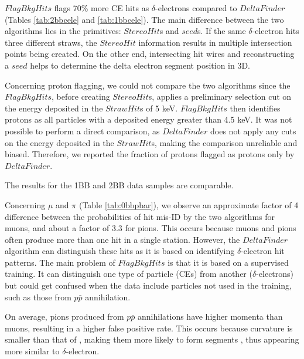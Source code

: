 $FlagBkgHits$ flags 70\% more CE hits 
as $\delta$-electrons compared to $DeltaFinder$ (Tables \ref{tab:2bbcele} 
and \ref{tab:1bbcele}). The main difference between the two algorithms lies in 
the primitives: $StereoHit$s and $seed$s. If the same 
$\delta$-electron hits three different straws, the $StereoHit$ 
information results in multiple intersection points being 
created. On the other end, intersecting hit wires and reconstructing a $seed$ helps 
to determine the delta electron segment position in 3D.

Concerning proton flagging, we could not compare the two 
algorithms since the $FlagBkgHits$, before creating $StereoHit$s, 
applies a preliminary selection cut on the energy deposited in 
the $StrawHit$s of 5 keV. $FlagBkgHits$ then identifies 
protons as all particles with a deposited energy greater than 
4.5 keV. It was not possible to perform a direct comparison, 
as $DeltaFinder$ does not apply any cuts on the energy deposited in 
the $StrawHit$s, making the comparison unreliable and biased. 
Therefore, we reported the fraction of protons flagged as protons only by $DeltaFinder$.

The results for the 1BB and 2BB data samples are comparable.



      
      Concerning $\mu$ and $\pi$ (Table \ref{tab:0bbpbar}), 
      we observe an approximate factor of 
      4 difference between the probabilities of hit mis-ID by the two algorithms 
      for muons, and about a factor of 3.3 for pions. This occurs because 
      muons and pions often produce more than one hit in a single station. However, the 
      $DeltaFinder$ algorithm can distinguish these hits as it 
      is based on identifying $\delta$-electron hit patterns. 
      The main problem of $FlagBkgHits$ is that it is based on a supervised 
      training. It can distinguish one type of particle (CEs) from 
      another ($\delta$-electrons) but could get confused when 
      the data include particles not used in the training, such as 
      those from $p\bar{p}$ annihilation. 
      
      On average, pions produced from $p\bar{p}$ annihilations 
      have higher momenta than muons, resulting in a higher false 
      positive rate. This occurs because  curvature 
      is smaller than that of ,
      making them more likely to form  segments 
      , thus appearing more similar to $\delta$-electron.


